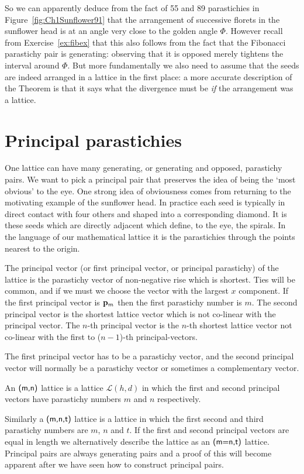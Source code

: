 So we can apparently deduce from the fact of 55 and 89 parastichies in Figure~\ref{fig:Ch1Sunflower91} that the arrangement of successive florets in the sunflower head is at an angle very close to the golden angle $\Phi$. However recall from Exercise~\ref{ex:fibex} that this also follows from the fact that the Fibonacci parastichy pair is generating: observing that it is opposed merely tightens the interval around $\Phi$. But more fundamentally we also need to assume that the seeds are indeed arranged in a lattice in the first place: a more accurate description of the Theorem is that it says what the divergence must be \textit{if} the arrangement was a lattice. 

\section{Principal parastichies}

\label{sec:ppair}
One lattice can have many generating, or generating and opposed, parastichy pairs.  We want to pick a principal pair that preserves the idea of being the `most obvious' to the eye. 
One strong idea of obviousness comes from returning to the motivating example of the sunflower head. In practice each seed is typically in direct contact with four others and shaped into a corresponding diamond. It is these seeds which are directly adjacent which define, to the eye, the spirals. 
In the language of our mathematical lattice it is the parastichies through the points nearest to the origin.
\begin{definition}
	The principal vector (or first principal vector, or principal parastichy) of the lattice is the parastichy vector of non-negative rise which is shortest. Ties will be common, and if we must we choose the vector with the largest $x$ component.
	If the first principal vector is ${\mathbf p}_{m}$ then the first parastichy number is $m$.  The second principal vector  is the shortest lattice vector which is not co-linear with the principal vector. The $n$-th principal vector is the $n$-th  shortest lattice vector not co-linear with the first to ($n-1$)-th principal-vectors.%
	
\end{definition}
The first principal vector has to be a parastichy vector, and the second principal vector will normally be a parastichy vector or sometimes a complementary vector.
\begin{definition}
	An  $\textsf{(m,n)}$ lattice is a lattice $\mathcal{L}(h,d)$ in which the first and second principal vectors have parastichy numbers $m$ and $n$ respectively. 
\end{definition}
Similarly a  $\textsf{(m,n,t)}$ lattice is a lattice  in which the first  second  and third parastichy numbers are $m$, $n$ and $t$. If the first and second principal  vectors are equal in length we alternatively describe the lattice as an $\textsf{(m=n,t)}$ lattice.
Principal pairs are always generating pairs and a proof of this will become apparent after we have seen how to construct principal pairs. 

